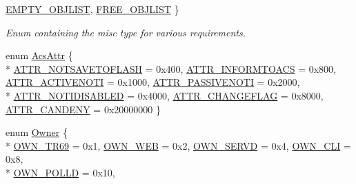 \begin{DoxyCompactItemize}
\hyperlink{group__LIBHELP_gga555fa67cbcfe777fe604bb5806ecab91a1c5c70d27e76da6c416f41667549bc3f}{E\-M\-P\-T\-Y\-\_\-\-O\-B\-J\-L\-I\-S\-T}, 
\hyperlink{group__LIBHELP_gga555fa67cbcfe777fe604bb5806ecab91aca545429fdcd331d3f4466a7b8a796f3}{F\-R\-E\-E\-\_\-\-O\-B\-J\-L\-I\-S\-T}
 \}
\begin{DoxyCompactList}\small\item\em Enum containing the misc type for various requirements. \end{DoxyCompactList}\item 
enum \hyperlink{group__LIBHELP_ga394c61369f4e995f18b58c77d1a3cccb}{Acs\-Attr} \{ \\*
\hyperlink{group__LIBHELP_gga394c61369f4e995f18b58c77d1a3cccba93fb968d56ea0dc63666d8372b8e35cb}{A\-T\-T\-R\-\_\-\-N\-O\-T\-S\-A\-V\-E\-T\-O\-F\-L\-A\-S\-H} = 0x400, 
\hyperlink{group__LIBHELP_gga394c61369f4e995f18b58c77d1a3cccba0a533fdeb6f381a6f85a6257aac1c61c}{A\-T\-T\-R\-\_\-\-I\-N\-F\-O\-R\-M\-T\-O\-A\-C\-S} = 0x800, 
\hyperlink{group__LIBHELP_gga394c61369f4e995f18b58c77d1a3cccba660b640063fbc5ee2d289a3fa58d0d93}{A\-T\-T\-R\-\_\-\-A\-C\-T\-I\-V\-E\-N\-O\-T\-I} = 0x1000, 
\hyperlink{group__LIBHELP_gga394c61369f4e995f18b58c77d1a3cccbaeb39c01e580d65085d016537cae56d77}{A\-T\-T\-R\-\_\-\-P\-A\-S\-S\-I\-V\-E\-N\-O\-T\-I} = 0x2000, 
\\*
\hyperlink{group__LIBHELP_gga394c61369f4e995f18b58c77d1a3cccba4c3c4ea2fce55ef95adf0b594fb1b038}{A\-T\-T\-R\-\_\-\-N\-O\-T\-I\-D\-I\-S\-A\-B\-L\-E\-D} = 0x4000, 
\hyperlink{group__LIBHELP_gga394c61369f4e995f18b58c77d1a3cccba45fd68ac3d5bebe5d404f59979f37f77}{A\-T\-T\-R\-\_\-\-C\-H\-A\-N\-G\-E\-F\-L\-A\-G} = 0x8000, 
\hyperlink{group__LIBHELP_gga394c61369f4e995f18b58c77d1a3cccba8286c92a167097d799178cac47443730}{A\-T\-T\-R\-\_\-\-C\-A\-N\-D\-E\-N\-Y} = 0x20000000
 \}
\item 
enum \hyperlink{group__LIBHELP_ga3b5e9e55eb7b08d5702a101e529e5507}{Owner} \{ \\*
\hyperlink{group__LIBHELP_gga3b5e9e55eb7b08d5702a101e529e5507afd4ab478568086323ad31db39ff42c55}{O\-W\-N\-\_\-\-T\-R69} = 0x1, 
\hyperlink{group__LIBHELP_gga3b5e9e55eb7b08d5702a101e529e5507a6d24bd2ee1e2fe7ec7b1453c835221f6}{O\-W\-N\-\_\-\-W\-E\-B} = 0x2, 
\hyperlink{group__LIBHELP_gga3b5e9e55eb7b08d5702a101e529e5507aa456b29529a8625118c2e5002ddde02a}{O\-W\-N\-\_\-\-S\-E\-R\-V\-D} = 0x4, 
\hyperlink{group__LIBHELP_gga3b5e9e55eb7b08d5702a101e529e5507a835c8e2f1c1761f7b6a96741727d034d}{O\-W\-N\-\_\-\-C\-L\-I} = 0x8, 
\\*
\hyperlink{group__LIBHELP_gga3b5e9e55eb7b08d5702a101e529e5507abdc4cf6227f600ff8519e594e91f3b68}{O\-W\-N\-\_\-\-P\-O\-L\-L\-D} = 0x10, 

\end{DoxyCompactItemize}
